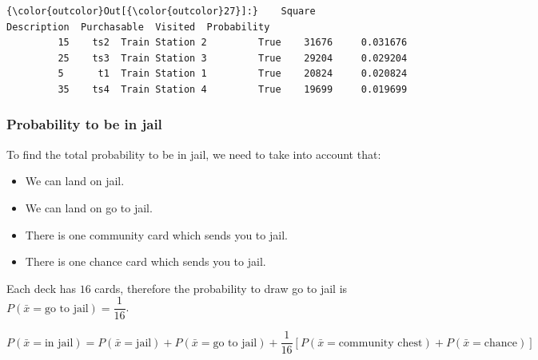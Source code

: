 \documentclass[11pt]{article}
\providecommand{\tightlist}{%
      \setlength{\itemsep}{0pt}\setlength{\parskip}{0pt}}
\begin{document}
\begin{Verbatim}[commandchars=\\\{\}]
{\color{outcolor}Out[{\color{outcolor}27}]:}    Square      Description  Purchasable  Visited  Probability
         15    ts2  Train Station 2         True    31676     0.031676
         25    ts3  Train Station 3         True    29204     0.029204
         5      t1  Train Station 1         True    20824     0.020824
         35    ts4  Train Station 4         True    19699     0.019699
\end{Verbatim}
            
    \hypertarget{probability-to-be-in-jail}{%
\subsubsection{Probability to be in
jail}\label{probability-to-be-in-jail}}

    To find the total probability to be in jail, we need to take into
account that:

\begin{itemize}
\tightlist
\item
  We can land on jail.
\item
  We can land on go to jail.
\item
  There is one community card which sends you to jail.
\item
  There is one chance card which sends you to jail.
\end{itemize}

Each deck has \(16\) cards, therefore the probability to draw go to jail
is \(P(\bar{x}=\text{go to jail})=\dfrac{1}{16}\).

\[P(\bar{x}=\text{in jail}) = P(\bar{x}=\text{jail}) + P(\bar{x}=\text{go to jail}) + \dfrac{1}{16}\left[ P(\bar{x}=\text{community chest}) + P(\bar{x}=\text{chance})\right] \]
\end{document}
